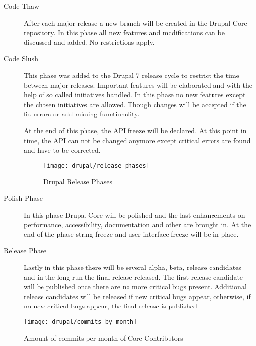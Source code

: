 \begin{description}

  \item[Code Thaw] After each major release a new branch will be created in the
    Drupal Core repository. In this phase all new features and modifications
    can be discussed and added. No restrictions apply.

  \item[Code Slush] This phase was added to the Drupal 7 release cycle to
    restrict the time between major releases. Important features will be
    elaborated and with the help of so called initiatives handled. In this
    phase no new features except the chosen initiatives are allowed. Though
    changes will be accepted if the fix errors or add missing functionality.

    At the end of this phase, the \ac{API} freeze will be declared. At this
    point in time, the \ac{API} can not be changed anymore except critical
    errors are found and have to be corrected.

\begin{figure}[htbp]
  \centering
  \texttt{[image: drupal/release\_phases]}
  \caption{Drupal Release Phases}
\end{figure}

  \item[Polish Phase] In this phase Drupal Core will be polished and the last
    enhancements on performance, accessibility, documentation and other are
    brought in. At the end of the phase string freeze and user interface freeze
    will be in place.

  \item[Release Phase] Lastly in this phase there will be several alpha, beta,
    release candidates and in the long run the final release released. The
    first release candidate will be published once there are no more critical
    bugs present. Additional release candidates will be released if new
    critical bugs appear, otherwise, if no new critical bugs appear, the final
    release is published.

\end{description}

\begin{figure}[htbp]
  \centering
  \texttt{[image: drupal/commits\_by\_month]}
  \caption{Amount of commits per month of Core Contributors}
\end{figure}


